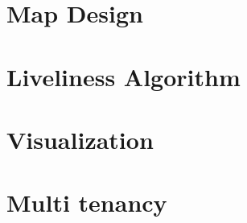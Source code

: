 \section{Map Design}
\label{sec:03_06_Map_Design}


\section{Liveliness Algorithm}


\section{Visualization}
\label{sec:0308}


\section{Multi tenancy}
